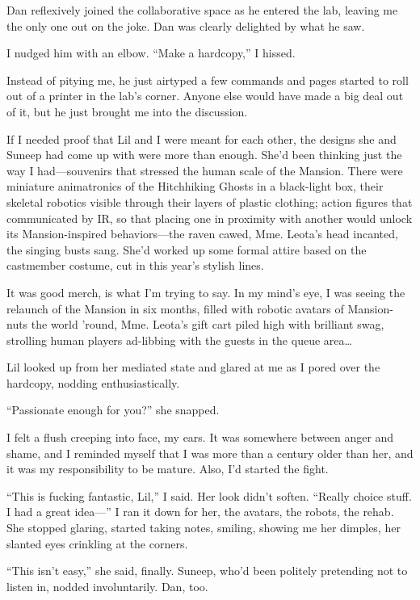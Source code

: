Dan reflexively joined the collaborative space as he entered the
lab, leaving me the only one out on the joke. Dan was clearly
delighted by what he saw.

I nudged him with an elbow. “Make a hardcopy,” I hissed.

Instead of pitying me, he just airtyped a few commands and pages
started to roll out of a printer in the lab's corner. Anyone else
would have made a big deal out of it, but he just brought me into
the discussion.

If I needed proof that Lil and I were meant for each other, the
designs she and Suneep had come up with were more than enough.
She'd been thinking just the way I had—souvenirs that stressed the
human scale of the Mansion. There were miniature animatronics of
the Hitchhiking Ghosts in a black-light box, their skeletal
robotics visible through their layers of plastic clothing; action
figures that communicated by IR, so that placing one in proximity
with another would unlock its Mansion-inspired behaviors—the raven
cawed, Mme. Leota's head incanted, the singing busts sang. She'd
worked up some formal attire based on the castmember costume, cut
in this year's stylish lines.

It was good merch, is what I'm trying to say. In my mind's eye, I
was seeing the relaunch of the Mansion in six months, filled with
robotic avatars of Mansion-nuts the world 'round, Mme. Leota's gift
cart piled high with brilliant swag, strolling human players
ad-libbing with the guests in the queue area…

Lil looked up from her mediated state and glared at me as I pored
over the hardcopy, nodding enthusiastically.

“Passionate enough for you?” she snapped.

I felt a flush creeping into face, my ears. It was somewhere
between anger and shame, and I reminded myself that I was more than
a century older than her, and it was my responsibility to be
mature. Also, I'd started the fight.

“This is fucking fantastic, Lil,” I said. Her look didn't soften.
“Really choice stuff. I had a great idea—” I ran it down for her,
the avatars, the robots, the rehab. She stopped glaring, started
taking notes, smiling, showing me her dimples, her slanted eyes
crinkling at the corners.

“This isn't easy,” she said, finally. Suneep, who'd been politely
pretending not to listen in, nodded involuntarily. Dan, too.

